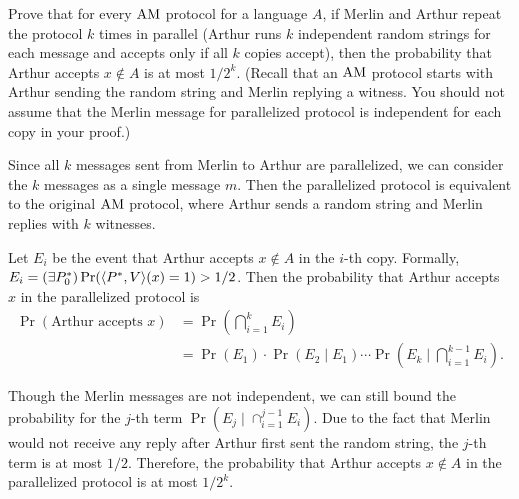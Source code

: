 \documentclass{homework}
\begin{document}
\begin{problem}
  Prove that for every $\textup{AM}$ protocol for a language $A$, if Merlin and Arthur
  repeat the protocol $k$ times in parallel (Arthur runs $k$ independent random
  strings for each message and accepts only if all $k$ copies accept), then the
  probability that Arthur accepts $x \not\in A$ is at most $1/2^{k}$.
  (Recall that an $\textup{AM}$ protocol starts with Arthur sending the random string
  and Merlin replying a witness.
  You should not assume that the Merlin message for parallelized protocol is
  independent for each copy in your proof.)
\end{problem}

\begin{solution}

  Since all $k$ messages sent from Merlin to Arthur are parallelized,
  we can consider the $k$ messages as a single message $m$.
  Then the parallelized protocol is equivalent to the original $\textup{AM}$ protocol,
  where Arthur sends a random string and Merlin replies with $k$ witnesses.

  Let $E_i$ be the event that Arthur accepts $x \not\in A$ in the $i$-th copy.
  Formally, $E_i = (\exists P_0^*)\Pr(\langle P^*, V\rangle(x) = 1) > 1/2$.
  Then the probability that Arthur accepts $x$ in the parallelized protocol is
  \begin{align*}
    \Pr(\text{Arthur accepts } x ) & = \Pr(\bigcap_{i=1}^{k} E_i) \\
    & = \Pr(E_1) \cdot \Pr(E_2 \mid E_1) \cdots \Pr(E_k \mid \bigcap_{i=1}^{k-1} E_i).
  \end{align*}

  Though the Merlin messages are not independent, we can still bound the probability
  for the $j$-th term $\Pr(E_j\mid \cap_{i = 1}^{j - 1}E_i)$. Due to the fact that
  Merlin would not receive any reply after Arthur first sent the random string,
  the $j$-th term is at most $1/2$. Therefore, the probability that Arthur accepts $x \not\in A$ in the parallelized
  protocol is at most $1/2^k$.

\end{solution}
\end{document}

